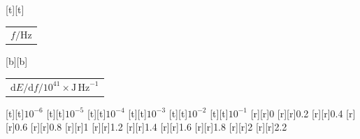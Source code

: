 %    
%
%
\begin{psfrags}%
\psfragscanon%
%
[t][t]{\color[rgb]{0,0,0}\setlength{\tabcolsep}{0pt}\begin{tabular}{c}{\Large$f/\mathrm{Hz}$}\end{tabular}}%
[b][b]{\color[rgb]{0,0,0}\setlength{\tabcolsep}{0pt}\begin{tabular}{c}{\Large$\mathrm{d}E/\mathrm{d}{f}/10^{41} \times \mathrm{J\,Hz}^{-1}$}\end{tabular}}%
%
[t][t]{$10^{-6}$}%
[t][t]{$10^{-5}$}%
[t][t]{$10^{-4}$}%
[t][t]{$10^{-3}$}%
[t][t]{$10^{-2}$}%
[t][t]{$10^{-1}$}%
%
[r][r]{0}%
[r][r]{0.2}%
[r][r]{0.4}%
[r][r]{0.6}%
[r][r]{0.8}%
[r][r]{1}%
[r][r]{1.2}%
[r][r]{1.4}%
[r][r]{1.6}%
[r][r]{1.8}%
[r][r]{2}%
[r][r]{2.2}%
%
%
\end{psfrags}%
%
